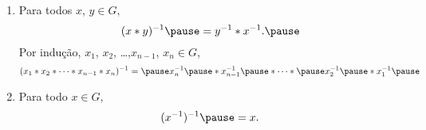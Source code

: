 \documentclass{beamer}
\begin{document}
    \begin{frame}
        \begin{proposicao}
            \begin{enumerate}[label={\roman*})]

                \conti

                \item Para todos $x$, $y \in G$,\pause
                \[
                    (x*y)^{-1} \pause = y^{-1}*x^{-1}.\pause
                \]
                Por indu{\c c}{\~a}o, \pause $x_1$, $x_2$, \dots ,$x_{n-1}$, $x_n \in G$,\pause
                \[
                    (x_1*x_2*\cdots *x_{n-1}*x_{n})^{-1} = \pause x^{-1}_{n}\pause *x^{-1}_{n-1}\pause *\cdots *\pause x^{-1}_2\pause *x^{-1}_1\pause 
                \]
                \item Para todo $x \in G$, \pause 
                \[
                    (x^{-1})^{-1} \pause = x.
                \]
            \end{enumerate}
        \end{proposicao}
    \end{frame}
    
\end{document}
